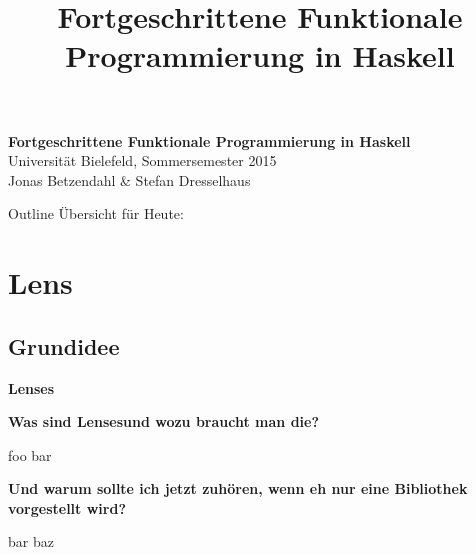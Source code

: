 \documentclass{beamer}
\title{Fortgeschrittene Funktionale Programmierung in Haskell}
\begin{document}
  

  \begin{frame}
  \begin{center}
    \huge\textbf{Fortgeschrittene Funktionale Programmierung in Haskell}\\ \bigskip
    \LARGE Universität Bielefeld, Sommersemester 2015\\ \bigskip
    \large Jonas Betzendahl \& Stefan Dresselhaus
    \end{center}
  \end{frame}

\begin{frame}[allowframebreaks]{Outline}
Übersicht für Heute:\smallskip

\tableofcontents
\end{frame}

\section{Lens}
\subsection{Grundidee}

\begin{frame}

\begin{center}
\Large
\textbf{Lenses}
\end{center}

\end{frame}


\begin{frame}

\textbf{Was sind \glqq Lenses\grqq und wozu braucht man die?}
\smallskip

foo bar

\pause
\bigskip

\textbf{Und warum sollte ich jetzt zuhören, wenn eh nur eine Bibliothek vorgestellt wird?}
\smallskip

bar baz

\end{frame}
\end{document}
